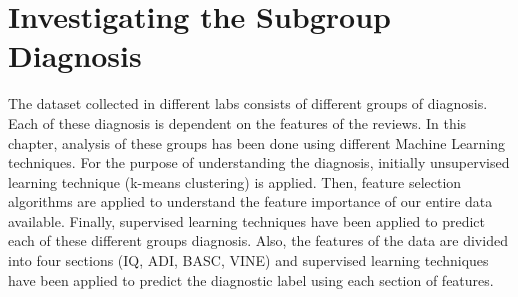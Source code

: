 \chapter{Investigating the Subgroup Diagnosis} \label{ch:meas}
\thispagestyle{plainbottom}
The dataset collected in different labs consists of different groups of diagnosis. Each of these diagnosis is dependent on the features of the reviews. In this chapter, analysis of these groups has been done using different Machine Learning techniques. For the purpose of understanding the diagnosis, initially unsupervised learning technique (k-means clustering) is applied. Then, feature selection algorithms are applied to understand the feature importance of our entire data available. Finally, supervised learning techniques have been applied to predict each of these different groups diagnosis. Also, the features of the data are divided into four sections (IQ, ADI, BASC, VINE) and supervised learning techniques have been applied to predict the diagnostic label using each section of features.

